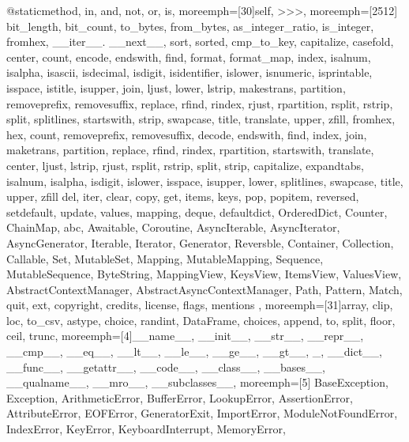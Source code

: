 {{  @staticmethod, in, and, not, or, is},
  moreemph=[30]{self, >>>},
  moreemph=[2512]{%
  bit\_length, bit\_count, to\_bytes, from\_bytes, as\_integer\_ratio,
  is\_integer, fromhex,
  \_\_iter\_\_. \_\_next\_\_,
  sort, sorted, cmp\_to\_key,
  capitalize, casefold, center, count, encode, endswith, find, format,
  format\_map, index, isalnum, isalpha, isascii, isdecimal, isdigit,
  isidentifier, islower, isnumeric, isprintable, isspace, istitle, isupper,
  join, ljust, lower, lstrip, makestrans, partition, removeprefix,
  removesuffix, replace, rfind, rindex, rjust, rpartition, rsplit, rstrip,
  split, splitlines, startswith, strip, swapcase, title, translate, upper,
  zfill,
  fromhex, hex,
  count, removeprefix, removesuffix, decode, endswith, find, index, join,
  maketrans, partition, replace, rfind, rindex, rpartition, startswith,
  translate, center, ljust, lstrip, rjust, rsplit, rstrip, split, strip,
  capitalize, expandtabs, isalnum, isalpha, isdigit, islower, isspace,
  isupper, lower, splitlines, swapcase, title, upper, zfill
  del, iter, clear, copy, get, items, keys, pop, popitem, reversed,
  setdefault, update, values, mapping,
  deque, defaultdict, OrderedDict, Counter, ChainMap, abc, Awaitable,
  Coroutine, AsyncIterable, AsyncIterator, AsyncGenerator, Iterable, Iterator,
  Generator, Reversble, Container, Collection, Callable, Set, MutableSet,
  Mapping, MutableMapping, Sequence, MutableSequence, ByteString, MappingView,
  KeysView, ItemsView, ValuesView,
  AbstractContextManager, AbstractAsyncContextManager,
  Path,
  Pattern, Match,
  quit, ext, copyright, credits, license, flags, mentions
  },
  moreemph=[31]{array, clip, loc, to\_csv, astype, choice, randint, DataFrame,
  choices, append, to, split, floor, ceil, trunc},
  moreemph=[4]{\_\_name\_\_, \_\_init\_\_, \_\_str\_\_, \_\_repr\_\_,
  \_\_cmp\_\_, \_\_eq\_\_, \_\_lt\_\_, \_\_le\_\_, \_\_ge\_\_, \_\_gt\_\_, \_,
  \_\_dict\_\_, \_\_func\_\_, \_\_getattr\_\_, \_\_code\_\_, \_\_class\_\_,
  \_\_bases\_\_, \_\_qualname\_\_, \_\_mro\_\_, \_\_subclasses\_\_},
  moreemph=[5]{%
  BaseException, Exception, ArithmeticError, BufferError, LookupError,
  AssertionError, AttributeError, EOFError, GeneratorExit, ImportError,
  ModuleNotFoundError, IndexError, KeyError, KeyboardInterrupt, MemoryError,
}}
